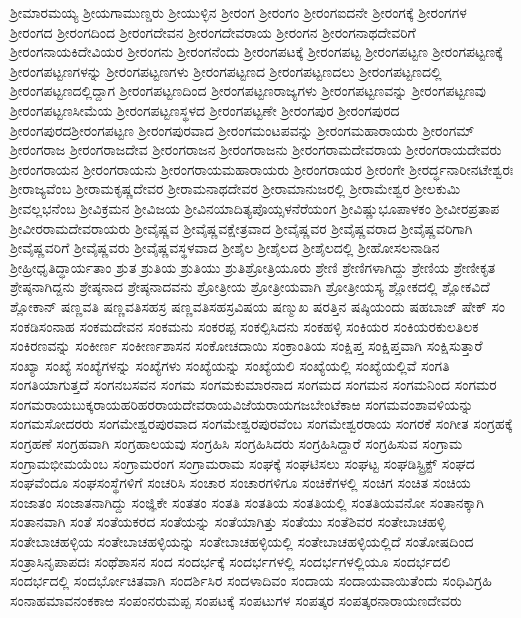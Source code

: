 {ಶ್ರೀಮಾರಮಯ್ಯ
ಶ್ರೀಯಗಾಮುಣ್ಡರು
ಶ್ರೀಯುಳ್ಳಿನ
ಶ್ರೀರಂಗ
ಶ್ರೀರಂಗಂ
ಶ್ರೀರಂಗಐದನೇ
ಶ್ರೀರಂಗಕ್ಕೆ
ಶ್ರೀರಂಗಗಳ
ಶ್ರೀರಂಗದ
ಶ್ರೀರಂಗದಿಂದ
ಶ್ರೀರಂಗದೇವನ
ಶ್ರೀರಂಗದೇವರಾಯ
ಶ್ರೀರಂಗನ
ಶ್ರೀರಂಗನಾಥದೇವರಿಗೆ
ಶ್ರೀರಂಗನಾಯಕಿದೇವಿಯರ
ಶ್ರೀರಂಗನು
ಶ್ರೀರಂಗನೆಂದು
ಶ್ರೀರಂಗಪಟಕ್ಕೆ
ಶ್ರೀರಂಗಪಟ್ಟ
ಶ್ರೀರಂಗಪಟ್ಟಣ
ಶ್ರೀರಂಗಪಟ್ಟಣಕ್ಕೆ
ಶ್ರೀರಂಗಪಟ್ಟಣಗಳನ್ನು
ಶ್ರೀರಂಗಪಟ್ಟಣಗಳು
ಶ್ರೀರಂಗಪಟ್ಟಣದ
ಶ್ರೀರಂಗಪಟ್ಟಣದಲು
ಶ್ರೀರಂಗಪಟ್ಟಣದಲ್ಲಿ
ಶ್ರೀರಂಗಪಟ್ಟಣದಲ್ಲಿದ್ದಾಗ
ಶ್ರೀರಂಗಪಟ್ಟಣದಿಂದ
ಶ್ರೀರಂಗಪಟ್ಟಣರಾಜ್ಯಗಳು
ಶ್ರೀರಂಗಪಟ್ಟಣವನ್ನು
ಶ್ರೀರಂಗಪಟ್ಟಣವು
ಶ್ರೀರಂಗಪಟ್ಟಣಸೀಮೆಯ
ಶ್ರೀರಂಗಪಟ್ಟಣಸ್ಥಳದ
ಶ್ರೀರಂಗಪಟ್ಟಣೇ
ಶ್ರೀರಂಗಪುರ
ಶ್ರೀರಂಗಪುರದ
ಶ್ರೀರಂಗಪುರದಶ್ರೀರಂಗಪಟ್ಟಣ
ಶ್ರೀರಂಗಪುರವಾದ
ಶ್ರೀರಂಗಮಂಟಪವನ್ನು
ಶ್ರೀರಂಗಮಹಾರಾಯರು
ಶ್ರೀರಂಗಮ್
ಶ್ರೀರಂಗರಾಜ
ಶ್ರೀರಂಗರಾಜದೇವ
ಶ್ರೀರಂಗರಾಜನ
ಶ್ರೀರಂಗರಾಜನು
ಶ್ರೀರಂಗರಾಮದೇವರಾಯ
ಶ್ರೀರಂಗರಾಯದೇವರು
ಶ್ರೀರಂಗರಾಯನ
ಶ್ರೀರಂಗರಾಯನು
ಶ್ರೀರಂಗರಾಯಮಹಾರಾಯರು
ಶ್ರೀರಂಗರಾಯರ
ಶ್ರೀರಂಗೇ
ಶ್ರೀರರ್ದ್ಧನಾರೀನಟೇಶ್ವರಃ
ಶ್ರೀರಾಜ್ಯವೆಂಬ
ಶ್ರೀರಾಮಕೃಷ್ಣದೇವರ
ಶ್ರೀರಾಮನಾಥದೇವರ
ಶ್ರೀರಾಮಾನುಜರಲ್ಲಿ
ಶ್ರೀರಾಮೇಶ್ವರ
ಶ್ರೀಲಕುಮಿ
ಶ್ರೀವಲ್ಲಭನೆಂಬ
ಶ್ರೀವಿಕ್ರಮನ
ಶ್ರೀವಿಜಯ
ಶ್ರೀವಿನಯಾದಿತ್ಯಪೊಯ್ಸಳನೆರೆಯಂಗ
ಶ್ರೀವಿಷ್ಣುಭೂಪಾಳಕಂ
ಶ್ರೀವೀರಪ್ರತಾಪ
ಶ್ರೀವೀರರಾಮದೇವರಾಯರು
ಶ್ರೀವೈಷ್ಣವ
ಶ್ರೀವೈಷ್ಣವಕ್ಷೇತ್ರವಾದ
ಶ್ರೀವೈಷ್ಣವರ
ಶ್ರೀವೈಷ್ಣವರಾದ
ಶ್ರೀವೈಷ್ಣವರಿಗಾಗಿ
ಶ್ರೀವೈಷ್ಣವರಿಗೆ
ಶ್ರೀವೈಷ್ಣವರು
ಶ್ರೀವೈಷ್ಣವಸ್ಥಳವಾದ
ಶ್ರೀಶೈಲ
ಶ್ರೀಶೈಲದ
ಶ್ರೀಶೈಲದಲ್ಲಿ
ಶ್ರೀಹೋಸಲನಾಡಿನ
ಶ್ರೀಹ್ರೀಧೃತಿದ್ಧಾರ್ಯತಾಂ
ಶ್ರುತ
ಶ್ರುತಿಯ
ಶ್ರುತಿಯು
ಶ್ರುತಿಶ್ರೋತ್ರಿಯೂರು
ಶ್ರೇಣಿ
ಶ್ರೇಣಿಗಳಾಗಿದ್ದು
ಶ್ರೇಣಿಯ
ಶ್ರೇಣೀಕೃತ
ಶ್ರೇಷ್ಠನಾಗಿದ್ದನು
ಶ್ರೇಷ್ಠನಾದ
ಶ್ರೇಷ್ಠನಾದವನು
ಶ್ರೋತ್ರೀಯ
ಶ್ರೋತ್ರೀಯವಾಗಿ
ಶ್ರೋತ್ರೀಯಸ್ಯ
ಶ್ಲೋಕದಲ್ಲಿ
ಶ್ಲೋಕವಿದೆ
ಶ್ಲೋಕಾನ್
ಷಣ್ಣವತಿ
ಷಣ್ಣವತಿಸಹಸ್ರ
ಷಣ್ಣವತಿಸಹಸ್ರವಿಷಯ
ಷಣ್ಮುಖ
ಷರತ್ತಿನ
ಷಷ್ಠಿಯಂದು
ಷಹಬಾಜ್
ಷೇಕ್
ಸಂ
ಸಂಕಡಿಸಂನಾಹ
ಸಂಕಮದೇವನ
ಸಂಕಮನು
ಸಂಕರಪ್ಪ
ಸಂಕಲ್ಪಿಸಿದನು
ಸಂಕಹಳ್ಳಿ
ಸಂಕಿಯರ
ಸಂಕಿಯರಕುಲತಿಲಕ
ಸಂಕಿರಣವನ್ನು
ಸಂಕೀರ್ಣ
ಸಂಕೀರ್ಣಶಾಸನ
ಸಂಕೋಚದಾಯಿ
ಸಂಕ್ರಾಂತಿಯ
ಸಂಕ್ಷಿಪ್ತ
ಸಂಕ್ಷಿಪ್ತವಾಗಿ
ಸಂಕ್ಷಿಸುತ್ತಾರೆ
ಸಂಖ್ಯಾ
ಸಂಖ್ಯೆ
ಸಂಖ್ಯೆಗಳನ್ನು
ಸಂಖ್ಯೆಗಳು
ಸಂಖ್ಯೆಯನ್ನು
ಸಂಖ್ಯೆಯಲಿ
ಸಂಖ್ಯೆಯಲ್ಲಿ
ಸಂಖ್ಯೆಯಲ್ಲಿವೆ
ಸಂಗತಿ
ಸಂಗತಿಯಾಗುತ್ತದೆ
ಸಂಗನಬಸವನ
ಸಂಗಮ
ಸಂಗಮಕುಮಾರನಾದ
ಸಂಗಮದ
ಸಂಗಮನ
ಸಂಗಮನಿಂದ
ಸಂಗಮರ
ಸಂಗಮರಾಯಬುಕ್ಕರಾಯಹರಿಹರರಾಯದೇವರಾಯವಿಜೆಯರಾಯಗಜಬೇಂಟೆಕಾಱ
ಸಂಗಮವಂಶಾವಳಿಯನ್ನು
ಸಂಗಮಸೋದರರು
ಸಂಗಮೇಶ್ವರಪುರವಾದ
ಸಂಗಮೇಶ್ವರಪುರವೆಂಬ
ಸಂಗಮೇಶ್ವರರಾಯ
ಸಂಗರಕೆ
ಸಂಗೀತ
ಸಂಗ್ರಹಕ್ಕೆ
ಸಂಗ್ರಹಣೆ
ಸಂಗ್ರಹವಾಗಿ
ಸಂಗ್ರಹಾಲಯವು
ಸಂಗ್ರಹಿಸಿ
ಸಂಗ್ರಹಿಸಿದರು
ಸಂಗ್ರಹಿಸಿದ್ದಾರೆ
ಸಂಗ್ರಹಿಸುವ
ಸಂಗ್ರಾಮ
ಸಂಗ್ರಾಮಭೀಮಯೆಂಬ
ಸಂಗ್ರಾಮರಂಗ
ಸಂಗ್ರಾಮರಾಮ
ಸಂಘಕ್ಕೆ
ಸಂಘಟಿಸಲು
ಸಂಘಟ್ಟ
ಸಂಘಡಿಸ್ಟ್ರಿಕ್ಟ್
ಸಂಘದ
ಸಂಘವೆಂದೂ
ಸಂಘಸಂಸ್ಥೆಗಳಿಗೆ
ಸಂಚರಿಸಿ
ಸಂಚಾರ
ಸಂಚಾರಗಳಿಗೂ
ಸಂಚಿಕೆಗಳಲ್ಲಿ
ಸಂಚಿಗ
ಸಂಚಿತ
ಸಂಚಿಯ
ಸಂಜಾತಂ
ಸಂಜಾತನಾಗಿದ್ದು
ಸಂಜ್ಞಿಕೇ
ಸಂತತಂ
ಸಂತತಿ
ಸಂತತಿಯ
ಸಂತತಿಯಲ್ಲಿ
ಸಂತತಿಯವನೋ
ಸಂತಾನಕ್ಕಾಗಿ
ಸಂತಾನವಾಗಿ
ಸಂತೆ
ಸಂತೆಯಕರದ
ಸಂತೆಯನ್ನು
ಸಂತೆಯಾಗಿತ್ತು
ಸಂತೆಯು
ಸಂತೆಶಿವರ
ಸಂತೇಬಾಚಹಳ್ಳಿ
ಸಂತೇಬಾಚಹಳ್ಳಿಯ
ಸಂತೇಬಾಚಹಳ್ಳಿಯನ್ನು
ಸಂತೇಬಾಚಹಳ್ಳಿಯಲ್ಲಿ
ಸಂತೇಬಾಚಹಳ್ಳಿಯಲ್ಲಿದೆ
ಸಂತೋಷದಿಂದ
ಸಂತ್ರಾಸಿನೃಪಾಪದಃ
ಸಂಥೆಶಾಸನ
ಸಂದ
ಸಂದರ್ಭಕ್ಕೆ
ಸಂದರ್ಭಗಳಲ್ಲಿ
ಸಂದರ್ಭಗಳಲ್ಲಿಯೂ
ಸಂದರ್ಭದಲಿ
ಸಂದರ್ಭದಲ್ಲಿ
ಸಂದರ್ಭೋಚಿತವಾಗಿ
ಸಂದರ್ಶಿಸಿರ
ಸಂದಳಾದಿವಂ
ಸಂದಾಯ
ಸಂದಾಯವಾಯಿತೆಂದು
ಸಂಧಿವಿಗ್ರಹಿ
ಸಂನಾಹಮಾವನಂಕಕಾಱ
ಸಂಪಂನರುಮಪ್ಪ
ಸಂಪಟಕ್ಕೆ
ಸಂಪಟುಗಳ
ಸಂಪತ್ಕರ
ಸಂಪತ್ಕರನಾರಾಯಣದೇವರು
}
